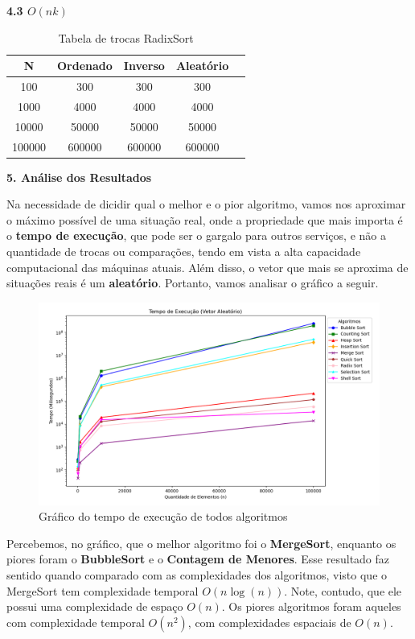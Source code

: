 \documentclass[10pt]{article}
\begin{document}
\vspace{0.5cm}

\textbf{4.3 $O(n k)$}

\begin{table}[H]
  \centering
  \caption{Tabela de trocas RadixSort}
  \begin{tabular}{|c|c|c|c|c|}
  \hline
  N & Ordenado & Inverso & Aleatório \\ \hline
  100 & 300 & 300 & 300 \\ \hline
  1000 & 4000 & 4000 & 4000 \\ \hline
  10000 & 50000 & 50000 & 50000 \\ \hline
  100000 & 600000 & 600000 & 600000 \\ \hline
  \end{tabular}
\end{table}

\vspace{0.25cm}

\textbf{5. Análise dos Resultados}

Na necessidade de dicidir qual o melhor e o pior algoritmo, vamos nos aproximar o máximo possível de uma situação real, onde a propriedade que mais importa é o \textbf{tempo de execução}, que pode ser o gargalo para outros serviços, e não a quantidade de trocas ou comparações, tendo em vista a alta capacidade computacional das máquinas atuais. Além disso, o vetor que mais se aproxima de situações reais é um \textbf{aleatório}. Portanto, vamos analisar o gráfico a seguir.

\begin{figure}[H]
  \centering
  \includegraphics[width=1\textwidth]{TempoExecGeralAleat2.png}
  \caption{Gráfico do tempo de execução de todos algoritmos}
  \label{fig:4}
\end{figure}

Percebemos, no gráfico, que o melhor algoritmo foi o \textbf{MergeSort}, enquanto os piores foram o \textbf{BubbleSort} e o \textbf{Contagem de Menores}. Esse resultado faz sentido quando comparado com as complexidades dos algoritmos, visto que o MergeSort tem complexidade temporal $O(n \log(n))$. Note, contudo, que ele possui uma complexidade de espaço $O(n)$. Os piores algoritmos foram aqueles com complexidade temporal $O(n^2)$, com complexidades espaciais de $O(n)$.

\vspace{0.25cm}
\end{document}
